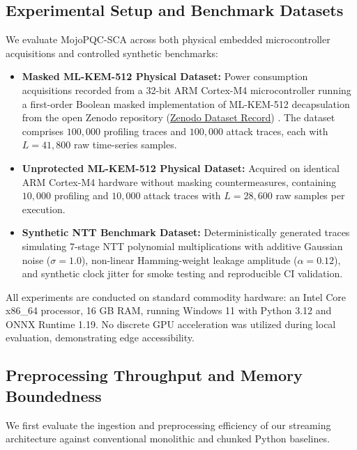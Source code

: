 \documentclass[letterpaper]{article}
\begin{document}
\subsection{Experimental Setup and Benchmark Datasets}
We evaluate MojoPQC-SCA across both physical embedded microcontroller acquisitions and controlled synthetic benchmarks:
\begin{itemize}
    \item \textbf{Masked ML-KEM-512 Physical Dataset:} Power consumption acquisitions recorded from a 32-bit ARM Cortex-M4 microcontroller running a first-order Boolean masked implementation of ML-KEM-512 decapsulation from the open Zenodo repository (\href{https://doi.org/10.5281/zenodo.6517855}{Zenodo Dataset Record}) \cite{zenodo_kyber_dataset,danvers2022side}. The dataset comprises $100,000$ profiling traces and $100,000$ attack traces, each with $L = 41,800$ raw time-series samples.
    \item \textbf{Unprotected ML-KEM-512 Physical Dataset:} Acquired on identical ARM Cortex-M4 hardware without masking countermeasures, containing $10,000$ profiling and $10,000$ attack traces with $L = 28,600$ raw samples per execution.
    \item \textbf{Synthetic NTT Benchmark Dataset:} Deterministically generated traces simulating 7-stage NTT polynomial multiplications with additive Gaussian noise ($\sigma = 1.0$), non-linear Hamming-weight leakage amplitude ($\alpha = 0.12$), and synthetic clock jitter for smoke testing and reproducible CI validation.
\end{itemize}

All experiments are conducted on standard commodity hardware: an Intel Core x86\_64 processor, 16 GB RAM, running Windows 11 with Python 3.12 and ONNX Runtime 1.19. No discrete GPU acceleration was utilized during local evaluation, demonstrating edge accessibility.

\subsection{Preprocessing Throughput and Memory Boundedness}
We first evaluate the ingestion and preprocessing efficiency of our streaming architecture against conventional monolithic and chunked Python baselines.
\end{document}
